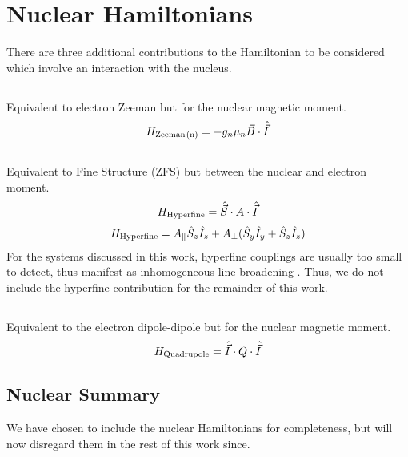 \section{Nuclear Hamiltonians}\label{nuclear}
There are three additional contributions to the Hamiltonian to be considered which involve an interaction with the nucleus.

\subsection{}
Equivalent to electron Zeeman but for the nuclear magnetic moment. 
\begin{equation}
    H_{\ce{Zeeman(n)}} = -g_n \mu_n \vec{B} \cdot \hat{\vec{I}}
    \label{eq:nuclear_zeeman_hamiltonian}
\end{equation}

\subsection{}
Equivalent to Fine Structure (ZFS) but between the nuclear and electron moment. 
\begin{equation}
    H_{\ce{Hyperfine}} = \hat{\vec{S}} \cdot A \cdot \hat{\vec{I}}
    \label{eq:hyperfine_hamiltonian_dense}
\end{equation}
\begin{equation}
    H_{\ce{Hyperfine}} = A_\parallel \hat{S}_z\hat{I}_z + A_\perp(\hat{S}_y\hat{I}_y + \hat{S}_z\hat{I}_z)
    \label{eq:hyperfine_hamiltonian_componentwise}
\end{equation}
For the systems discussed in this work, hyperfine couplings are usually too small to detect, 
thus manifest as inhomogeneous line broadening \cite{SpinStates}. Thus, we do not include the hyperfine contribution 
for the remainder of this work. 

\subsection{}
Equivalent to the electron dipole-dipole but for the nuclear magnetic moment. 
\begin{equation}
    H_{\ce{Quadrupole}} = \hat{\vec{I}} \cdot Q \cdot \hat{\vec{I}}
    \label{eq:nuclear_quadrupole}
\end{equation}

\subsection{Nuclear Summary}
We have chosen to include the nuclear Hamiltonians for completeness, but will now disregard them in the rest of this work since.
